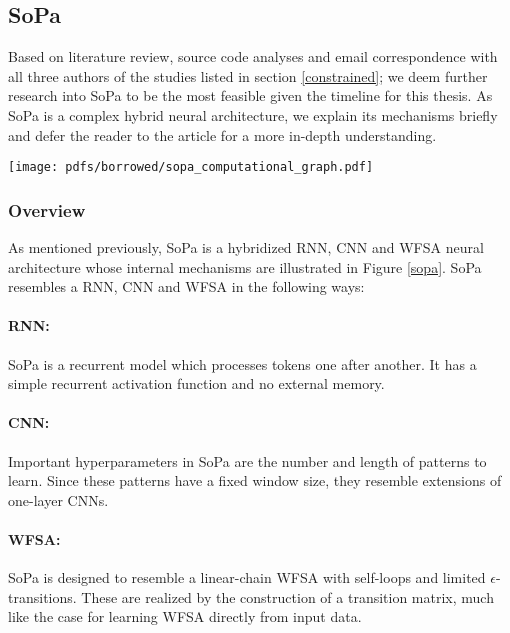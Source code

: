 \subsection{SoPa}

Based on literature review, source code analyses and email correspondence with
all three authors of the studies listed in section \ref{constrained}; we deem
further research into SoPa to be the most feasible given the timeline for this
thesis. As SoPa is a complex hybrid neural architecture, we explain its
mechanisms briefly and defer the reader to the article for a more in-depth
understanding.

\begin{figure*}
  \centering
  \texttt{[image: pdfs/borrowed/sopa\_computational\_graph.pdf]}
  \caption{Schematic of the SoPa neural architecture \citep{schwartz2018sopa}}
  \label{sopa}
\end{figure*}

\subsubsection{Overview}

As mentioned previously, SoPa is a hybridized RNN, CNN and WFSA neural
architecture whose internal mechanisms are illustrated in Figure \ref{sopa}.
SoPa resembles a RNN, CNN and WFSA in the following ways:

\paragraph{RNN:} SoPa is a recurrent model which processes tokens one after
another. It has a simple recurrent activation function and no external memory.

\paragraph{CNN:} Important hyperparameters in SoPa are the number and length of
patterns to learn. Since these patterns have a fixed window size, they resemble
extensions of one-layer CNNs.

\paragraph{WFSA:} SoPa is designed to resemble a linear-chain WFSA with
self-loops and limited $\epsilon$-transitions. These are realized by the
construction of a transition matrix, much like the case for learning WFSA
directly from input data.

